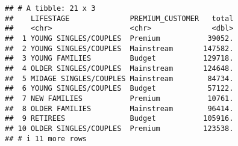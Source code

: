 \documentclass[
]{article}
\newenvironment{Shaded}{\begin{snugshade}}{\end{snugshade}}
\newcommand{\AttributeTok}[1]{\textcolor[rgb]{0.13,0.29,0.53}{#1}}
\newcommand{\DecValTok}[1]{\textcolor[rgb]{0.00,0.00,0.81}{#1}}
\newcommand{\FloatTok}[1]{\textcolor[rgb]{0.00,0.00,0.81}{#1}}
\newcommand{\FunctionTok}[1]{\textcolor[rgb]{0.13,0.29,0.53}{\textbf{#1}}}
\newcommand{\NormalTok}[1]{#1}
\newcommand{\OtherTok}[1]{\textcolor[rgb]{0.56,0.35,0.01}{#1}}
\newcommand{\SpecialCharTok}[1]{\textcolor[rgb]{0.81,0.36,0.00}{\textbf{#1}}}
\newcommand{\StringTok}[1]{\textcolor[rgb]{0.31,0.60,0.02}{#1}}
\begin{document}
\begin{verbatim}
## # A tibble: 21 x 3
##    LIFESTAGE              PREMIUM_CUSTOMER   total
##    <chr>                  <chr>              <dbl>
##  1 YOUNG SINGLES/COUPLES  Premium           39052.
##  2 YOUNG SINGLES/COUPLES  Mainstream       147582.
##  3 YOUNG FAMILIES         Budget           129718.
##  4 OLDER SINGLES/COUPLES  Mainstream       124648.
##  5 MIDAGE SINGLES/COUPLES Mainstream        84734.
##  6 YOUNG SINGLES/COUPLES  Budget            57122.
##  7 NEW FAMILIES           Premium           10761.
##  8 OLDER FAMILIES         Mainstream        96414.
##  9 RETIREES               Budget           105916.
## 10 OLDER SINGLES/COUPLES  Premium          123538.
## # i 11 more rows
\end{verbatim}

\begin{Shaded}
\end{Shaded}
\end{document}
